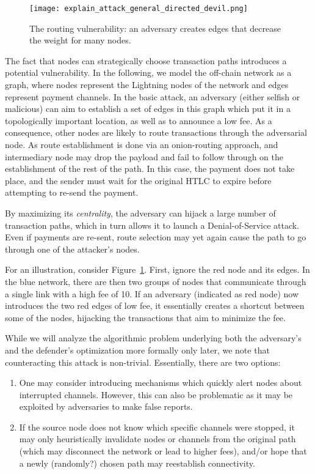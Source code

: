     \begin{figure}
    	\centering
    	\texttt{[image: explain\_attack\_general\_directed\_devil.png]}
    	\caption{The routing vulnerability: an adversary creates edges that decrease the weight for many nodes.}
    	\label{figure::attack_ilustration}
    \end{figure}
    

The fact that nodes can strategically choose transaction paths 
introduces a potential vulnerability. In the following,
we model the off-chain network as a graph, 
where nodes represent the Lightning nodes of the network and 
edges represent payment channels. 
In the basic attack, an 
adversary (either selfish or malicious) can aim to establish a set of edges 
in this graph which put it in a topologically important location,
as well as to announce a low fee.
As a consequence, other nodes are likely to route transactions
through the adversarial node. As route establishment is done via an onion-routing approach, and intermediary node may drop the payload and fail to follow through on the establishment of the rest of the path. In this case, the payment does not take place, and the sender must wait for the original HTLC to expire before attempting to re-send the payment. 

By maximizing its \emph{centrality}, the adversary can
hijack a large number of transaction paths, which in turn allows it to launch a Denial-of-Service
attack. Even if payments are re-sent, route selection may yet again cause the path to go through one of the attacker's nodes. 

For an illustration, consider Figure~\ref{figure::attack_ilustration}.
First, ignore the red node and its edges. In the blue network, 
there are then two groups of nodes that communicate
through a single link with a high fee of 10. 
If an adversary (indicated as red node) now introduces 
the two red edges of low fee, it essentially creates 
a shortcut between some of the nodes, hijacking 
the transactions that aim to minimize the fee.

While we will analyze the algorithmic problem underlying
both the adversary's and the defender's optimization more formally only later,
we note that counteracting this attack is non-trivial.
Essentially, there are two options:
\begin{enumerate}
    \item  One may consider introducing mechanisms
    which quickly alert nodes about interrupted channels.
    However, this can also be problematic as it may be exploited
    by adversaries to make false reports.
    \item If the source node does not know which specific channels were stopped, 
    it may only heuristically invalidate nodes or channels from the original path 
    (which may disconnect the network or lead to higher fees), 
    and/or hope that a newly (randomly?) chosen path may reestablish
    connectivity.
\end{enumerate}

